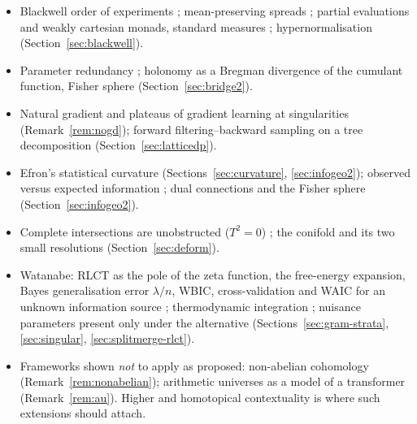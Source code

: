 \documentclass[11pt]{article}
\theoremstyle{definition}
\theoremstyle{remark}
\begin{document}
\begin{itemize}[itemsep=0pt]
  \item Blackwell order of experiments \cite{blackwell53}; mean-preserving spreads \cite{rothschildstiglitz70}; partial evaluations and weakly cartesian monads, standard measures \cite{fritzperrone20,bohinenperrone25}; hypernormalisation \cite{jacobs17} (Section~\ref{sec:blackwell}).
  \item Parameter redundancy \cite{catchpolemorgan97}; holonomy as a Bregman divergence of the cumulant function, Fisher sphere \cite{amarinagaoka} (Section~\ref{sec:bridge2}).
  \item Natural gradient and plateaus of gradient learning at singularities \cite{amari98,amariparkozeki06} (Remark~\ref{rem:nogd}); forward filtering--backward sampling on a tree decomposition (Section~\ref{sec:latticedp}).
  \item Efron's statistical curvature \cite{efron75} (Sections~\ref{sec:curvature}, \ref{sec:infogeo2}); observed versus expected information \cite{efronhinkley78}; dual connections and the Fisher sphere \cite{amarinagaoka} (Section~\ref{sec:infogeo2}).
  \item Complete intersections are unobstructed ($T^2=0$) \cite{hartshorne10}; the conifold and its two small resolutions \cite{atiyah58} (Section~\ref{sec:deform}).
  \item Watanabe: RLCT as the pole of the zeta function, the free-energy expansion, Bayes generalisation error $\lambda/n$, WBIC, cross-validation and WAIC for an unknown information source \cite{watanabe22,watanabe,watanabe18,wbic}; thermodynamic integration \cite{gelmanmeng}; nuisance parameters present only under the alternative \cite{davies87} (Sections~\ref{sec:gram-strata}, \ref{sec:singular}, \ref{sec:splitmerge-rlct}).
  \item Frameworks shown \emph{not} to apply as proposed: non-abelian cohomology \cite{giraud,breen} (Remark~\ref{rem:nonabelian}); arithmetic universes as a model of a transformer \cite{joyal73,maietti10} (Remark~\ref{rem:au}). Higher and homotopical contextuality \cite{orbr17,kharoofokay} is where such extensions should attach.
\end{itemize}
\end{document}
